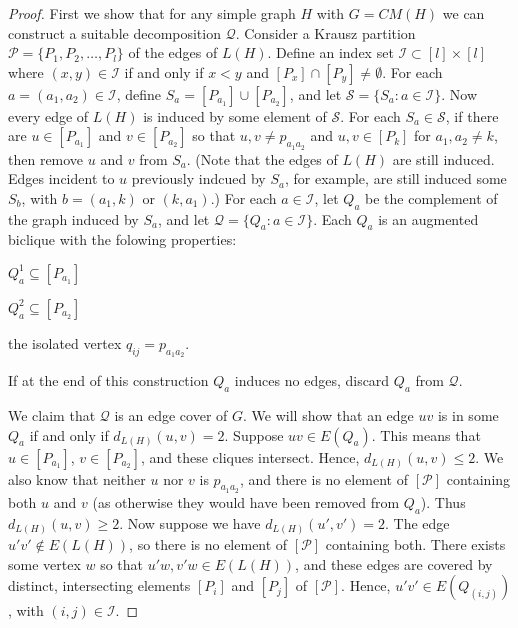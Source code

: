 \begin{proof}
First we show that for any simple graph $H$ with $G = CM(H)$ we can construct a suitable decomposition $\mathcal{Q}$.
%
Consider a Krausz partition $\mathcal{P} = \{P_1, P_2, \ldots, P_l\}$ of the edges of $L(H)$.
%
Define an index set $\mathcal{I} \subset [l]\times[l]$ where $(x,y) \in \mathcal{I}$ if and only if $x < y$ and $[P_x] \cap [P_y] \neq \emptyset$.
%
For each $a = (a_1, a_2) \in \mathcal{I}$, define $S_a = [P_{a_1}] \cup [P_{a_2}]$, and let $\mathcal{S} = \{S_a: a \in \mathcal{I}\}$.
%
Now every edge of $L(H)$ is induced by some element of $\mathcal{S}$.
%
For each $S_a \in \mathcal{S}$, if there are $u \in [P_{a_1}]$ and $v \in [P_{a_2}]$ so that $u,v \neq p_{a_1a_2}$ and $u,v \in [P_k]$ for $a_1,a_2\neq k$, then remove $u$ and $v$ from $S_a$.  
%
(Note that the edges of $L(H)$ are still induced. Edges incident to $u$ previously indcued by $S_{a}$, for example, are still induced some $S_{b}$, with $b = (a_1, k)$ or $(k, a_1)$.)
%
For each $a \in \mathcal{I}$, let $Q_a$ be the complement of the graph induced by  $S_{a}$, and let $\mathcal{Q} = \{Q_a: a \in \mathcal{I}\}$.
%
Each $Q_{a}$ is an augmented biclique with the folowing properties: 
\begin{description}
	{\setlength\itemindent{25pt}
	\item[a.] $Q_{a}^1 \subseteq [P_{a_1}]$
	\item[b.] $Q_{a}^2 \subseteq [P_{a_2}]$
	\item[c.] the isolated vertex $q_{ij} = p_{a_1a_2}$.}
\end{description}
%
If at the end of this construction $Q_{a}$ induces no edges,  discard $Q_{a}$ from $\mathcal{Q}$.   

We claim that $\mathcal{Q}$ is an edge cover of $G$.
%
We will show that an edge $uv$ is in some $Q_a$ if and only if $d_{L(H)}(u,v) = 2$.
%
Suppose $uv \in E(Q_a)$.
%
This means that $u \in [P_{a_1}]$, $v \in [P_{a_2}]$, and these cliques intersect.
%
Hence, $d_{L(H)}(u,v) \leq 2$.
%
We also know that neither $u$ nor $v$ is $p_{a_1a_2}$, and there is no element of $[\mathcal{P}]$ containing both $u$ and $v$ (as otherwise they would have been removed from $Q_{a}$).
%
Thus $d_{L(H)}(u,v) \geq 2$.
%
Now suppose we have $d_{L(H)}(u',v') = 2$.  The edge $u'v' \notin E(L(H))$, so there is no element of $[\mathcal{P}]$ containing both.
%
There exists some vertex $w$ so that $u'w, v'w \in E(L(H))$, and these edges are covered by distinct, intersecting elements $[P_i]$ and $[P_j]$ of $[\mathcal{P}]$.  
%
Hence, $u'v' \in E(Q_{(i,j)})$, with $(i,j) \in \mathcal{I}$.


\end{proof}
